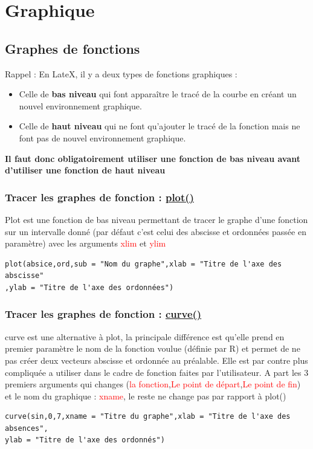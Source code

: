 \documentclass{article}
\newcommand{\argument}[1]{\textcolor{red}{#1}}
\begin{document}
\section{Graphique}

\subsection{Graphes de fonctions}\label{rappel bas/haut niveau}
Rappel : En LateX, il y a deux types de fonctions graphiques :
\begin{itemize}
    \item Celle de \textbf{bas niveau} qui font apparaître le tracé de la courbe en créant un nouvel environnement graphique.
    \item Celle de \textbf{haut niveau} qui ne font qu'ajouter le tracé de la fonction mais ne font pas de nouvel environnement graphique. 
\end{itemize}
\textbf{Il faut donc obligatoirement utiliser une fonction de bas niveau avant d'utiliser une fonction de haut niveau}
\subsubsection{Tracer les graphes de fonction : \href{https://www.rdocumentation.org/packages/graphics/versions/3.6.2/topics/plot}{plot()}}
Plot est une fonction de bas niveau permettant de tracer le graphe d'une fonction sur un intervalle donné (par défaut c'est celui des abscisse et ordonnées passée en paramètre) avec les arguments \argument{xlim} et \argument{ylim}
\begin{verbatim}
plot(absice,ord,sub = "Nom du graphe",xlab = "Titre de l'axe des abscisse"
,ylab = "Titre de l'axe des ordonnées")
\end{verbatim}
\subsubsection{Tracer les graphes de fonction : \href{https://www.rdocumentation.org/packages/graphics/versions/3.6.2/topics/curve}{curve()} }
curve est une alternative à plot, la principale différence est qu'elle prend en premier paramètre le nom de la fonction voulue (définie par R) et permet de ne pas créer deux vecteurs abscisse et ordonnée au préalable. Elle est par contre plus compliquée a utiliser dans le cadre de fonction faites par l'utilisateur. A part les 3 premiers arguments qui changes (\argument{la fonction},\argument{Le point de départ},\argument{Le point de fin}) et le nom du graphique : \argument{xname}, le reste ne change pas par rapport à plot()
\begin{verbatim}
curve(sin,0,7,xname = "Titre du graphe",xlab = "Titre de l'axe des absences",
ylab = "Titre de l'axe des ordonnés")
\end{verbatim}
\end{document}

